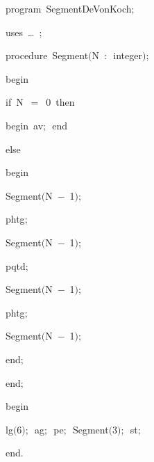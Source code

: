
{
\parindent {}
\medskip

\carrenoir
\vspace{\neglskip}\mbox{\blc  \idt  \mcl program\idt \ SegmentDeVonKoch$;$
}\par 
\vspace{\neglskip}\mbox{\blc \blk\idt \mcl uses\idt \ \ldots\ $;$
}\par 
\medskip

\pagebreak[3] 
\vspace{\neglskip}\mbox{\blc  \blk\idt  \mcl procedure\idt \ Segment$($N\ $:$\ integer$)$$;$}\par 
\vspace{\neglskip}\mbox{\blc  \blk\idt  \mcl begin\idt }\par 
\pagebreak[3] 
\vspace{\neglskip}\mbox{\blc  \blk\blk\idt  \mcl if\idt \ N\ $=$\ 0\ \mcl then\idt }\par 
\vspace{\neglskip}\mbox{\blc  \blk\blk\blk\idt  \mcl begin\idt \ av$;$\ \mcl end\idt }\par 
\pagebreak[3] 
\vspace{\neglskip}\mbox{\blc  \blk\blk\idt  \mcl else\idt }\par 
\vspace{\neglskip}\mbox{\blc  \blk\blk\blk\idt  \mcl begin\idt }\par 
\vspace{\neglskip}\mbox{\blc  \blk\blk\blk\blk\idt  Segment$($N\ $-$\ 1$)$$;$}\par 
\vspace{\neglskip}\mbox{\blc  \blk\blk\blk\blk\idt  phtg$;$\ }\par 
\vspace{\neglskip}\mbox{\blc  \blk\blk\blk\blk\idt  Segment$($N\ $-$\ 1$)$$;$}\par 
\vspace{\neglskip}\mbox{\blc  \blk\blk\blk\blk\idt  pqtd$;$\ }\par 
\vspace{\neglskip}\mbox{\blc  \blk\blk\blk\blk\idt  Segment$($N\ $-$\ 1$)$$;$}\par 
\vspace{\neglskip}\mbox{\blc  \blk\blk\blk\blk\idt  phtg$;$\ }\par 
\vspace{\neglskip}\mbox{\blc  \blk\blk\blk\blk\idt  Segment$($N\ $-$\ 1$)$$;$}\par 
\vspace{\neglskip}\mbox{\blc  \blk\blk\blk\idt  \mcl end\idt $;$}\par 
\vspace{\neglskip}\mbox{\blc  \blk\idt  \mcl end\idt $;$}\par 
\medskip

\vspace{\neglskip}\mbox{\blc  \idt  \mcl begin\idt }\par 
\vspace{\neglskip}\mbox{\blc  \blk\blk\idt  lg$($6$)$$;$\ ag$;$\ pe$;$\ Segment$($3$)$$;$\ st$;$}\par 
\vspace{\neglskip}\mbox{\blc  \idt  \mcl end\idt $.$}\par 

\medskip }

